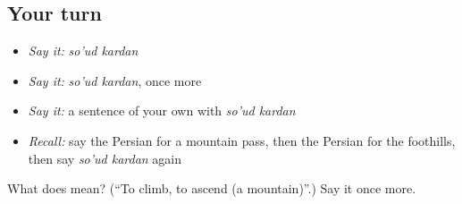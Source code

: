 \subsection*{Your turn}
\begin{itemize}
\raggedright
  \item \emph{Say it:} \emph{so'ud kardan}
  \item \emph{Say it:} \emph{so'ud kardan}, once more
  \item \emph{Say it:} a sentence of your own with \emph{so'ud kardan}
  \item \emph{Recall:} say the Persian for a mountain pass, then the Persian for the foothills, then say \emph{so'ud kardan} again
\end{itemize}

\begin{tcolorbox}[breakable,colback=teal!4,colframe=teal!35!black,title={Before you move on}]
What does   mean? (\textquotedblleft{}To climb, to ascend (a mountain)\textquotedblright{}.) Say it once more.
\end{tcolorbox}
